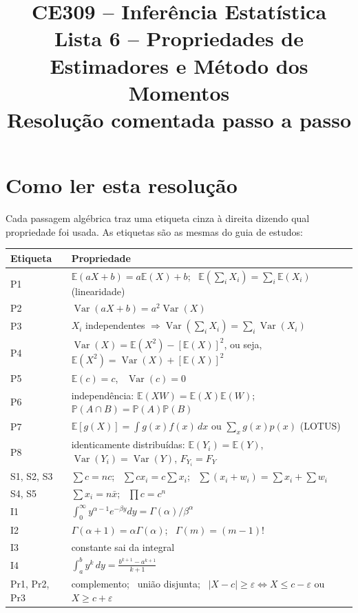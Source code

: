 \documentclass[11pt,a4paper]{article}
\title{\textbf{CE309 -- Inferência Estatística}\\[4pt]
\large Lista 6 -- Propriedades de Estimadores e Método dos Momentos\\
Resolução comentada passo a passo}
\author{}
\date{}
\newcommand{\E}{\mathbb{E}}
\newcommand{\Var}{\operatorname{Var}}
\newcommand{\Prob}{\mathbb{P}}
\begin{document}
\maketitle
\tableofcontents
\newpage

\section*{Como ler esta resolução}

Cada passagem algébrica traz uma etiqueta cinza à direita dizendo qual propriedade foi usada. As etiquetas são as mesmas do guia de estudos:

\begin{center}
\footnotesize
\renewcommand{\arraystretch}{1.35}
\begin{tabular}{@{}ll@{}}
\toprule
Etiqueta & Propriedade\\
\midrule
P1 & $\E(aX+b)=a\E(X)+b$; \ $\E(\sum_iX_i)=\sum_i\E(X_i)$ (linearidade)\\
P2 & $\Var(aX+b)=a^2\Var(X)$\\
P3 & $X_i$ independentes $\Rightarrow\Var(\sum_iX_i)=\sum_i\Var(X_i)$\\
P4 & $\Var(X)=\E(X^2)-[\E(X)]^2$, ou seja, $\E(X^2)=\Var(X)+[\E(X)]^2$\\
P5 & $\E(c)=c$, \ $\Var(c)=0$\\
P6 & independência: $\E(XW)=\E(X)\E(W)$; \ $\Prob(A\cap B)=\Prob(A)\Prob(B)$\\
P7 & $\E[g(X)]=\int g(x)f(x)\,dx$ ou $\sum_xg(x)p(x)$ (LOTUS)\\
P8 & identicamente distribuídas: $\E(Y_i)=\E(Y)$, $\Var(Y_i)=\Var(Y)$, $F_{Y_i}=F_Y$\\
S1, S2, S3 & $\sum c=nc$; \ $\sum cx_i=c\sum x_i$; \ $\sum(x_i+w_i)=\sum x_i+\sum w_i$\\
S4, S5 & $\sum x_i=n\bar x$; \ $\prod c=c^n$\\
I1 & $\int_0^\infty y^{\alpha-1}e^{-\beta y}dy=\Gamma(\alpha)/\beta^\alpha$\\
I2 & $\Gamma(\alpha+1)=\alpha\Gamma(\alpha)$; \ $\Gamma(m)=(m-1)!$\\
I3 & constante sai da integral\\
I4 & $\int_a^b y^k\,dy=\frac{b^{k+1}-a^{k+1}}{k+1}$\\
Pr1, Pr2, Pr3 & complemento; \ união disjunta; \ $|X-c|\ge\varepsilon\iff X\le c-\varepsilon$ ou $X\ge c+\varepsilon$\\

\end{tabular}
\end{center}
\end{document}
